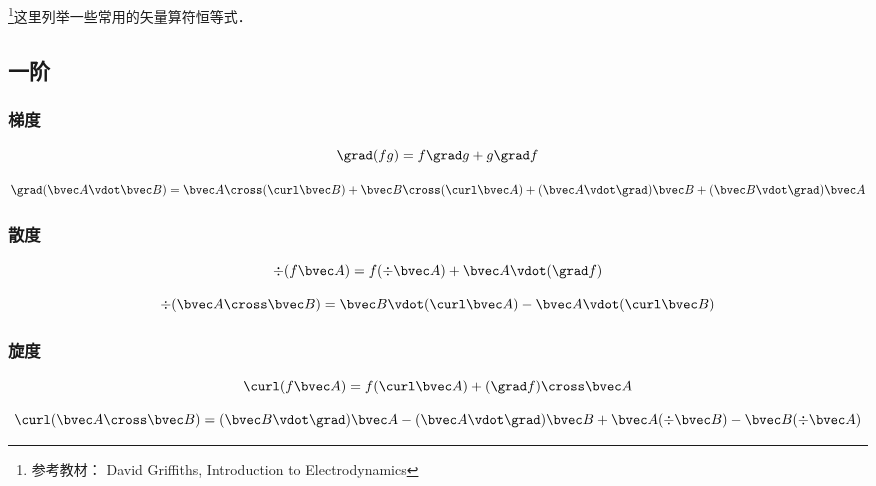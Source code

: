 
\begin{issues}
\issueAbstract
\end{issues}



\footnote{参考教材： David Griffiths, Introduction to Electrodynamics}这里列举一些常用的矢量算符恒等式．

\subsection{一阶}
\subsubsection{梯度}
\begin{equation}\label{VopEq_eq2}
\grad (fg) = f\grad g + g \grad f
\end{equation}

\begin{equation}
\grad (\bvec A \vdot \bvec B) = \bvec A \cross (\curl \bvec B) + \bvec B \cross (\curl \bvec A) + (\bvec A \vdot \grad) \bvec B + (\bvec B \vdot \grad) \bvec A
\end{equation}

\subsubsection{散度}

\begin{equation}\label{VopEq_eq1}
\div (f \bvec A) = f (\div \bvec A) + \bvec A \vdot (\grad f)
\end{equation}

\begin{equation}\label{VopEq_eq4}
\div (\bvec A \cross \bvec B) = \bvec B \vdot (\curl \bvec A) - \bvec A \vdot (\curl \bvec B)
\end{equation}

\subsubsection{旋度}
\begin{equation}\label{VopEq_eq3}
\curl(f\bvec A) = f (\curl\bvec A) + (\grad f) \cross\bvec A
\end{equation}

\begin{equation}
\curl (\bvec A \cross \bvec B) = (\bvec B \vdot \grad) \bvec A - (\bvec A \vdot \grad) \bvec B + \bvec A (\div \bvec B) - \bvec B (\div \bvec A)
\end{equation}

